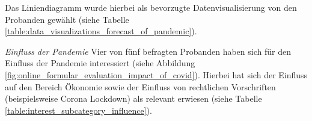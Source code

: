 Das Liniendiagramm wurde hierbei als bevorzugte Datenvisualisierung von den Probanden gewählt (siehe Tabelle \ref{table:data_visualizations_forecast_of_pandemic}).

\begin{table}[h]
\centering
{}
\caption{Ausgewählte Datenvisualisierungen pro Anwendungsfall für den Bereich ``Trendvorhersagen zur Pandemie`` (Eigene Darstellung)}
\label{table:data_visualizations_forecast_of_pandemic}
\end{table}

\clearpage
\noindent
\textit{Einfluss der Pandemie}
\newline
\indent
Vier von fünf befragten Probanden haben sich für den Einfluss der Pandemie interessiert (siehe Abbildung \ref{fig:online_formular_evaluation_impact_of_covid}). Hierbei hat sich der Einfluss auf den Bereich Ökonomie sowie der Einfluss von rechtlichen Vorschriften (beispielsweise Corona Lockdown) als relevant erwiesen (siehe Tabelle \ref{table:interest_subcategory_influence}).

\begin{table}[h]
\centering
{}
\caption{Interessenzrelevanz der Probanden für Unterkategorien des Bereichs ``Einfluss der Pandemie`` (Eigene Darstellung)}
\label{table:interest_subcategory_influence}
\end{table}

